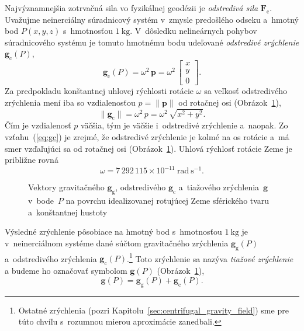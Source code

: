 \documentclass[a4paper,12pt]{book}
\newcommand{\gidx}{\mathrm g}
\newcommand{\cidx}{\mathrm c}
\let\vec\mathbf
\begin{document}
Najvýznamnejšia zotrvačná sila vo fyzikálnej geodézii je \emph{odstredivá sila}
$\vec F_\cidx$.  Uvažujme neinerciálny súradnicový systém v~zmysle predošlého
odseku a~hmotný bod $P(x, y, z)$ s~hmotnosťou $1\ \mathrm{kg}$.  V~dôsledku
nelineárnych pohybov súradnicového systému je tomuto hmotnému bodu udeľované
\emph{odstredivé zrýchlenie} $\vec g_\cidx(P)$,
%
\begin{equation}
\label{eq:gc}
\vec g_\cidx(P) = \omega^2 \, \vec p =
%
\omega^2 \, \begin{bmatrix}
x\\
y\\
0
\end{bmatrix}
{.}
\end{equation}
%
Za predpokladu konštantnej uhlovej rýchlosti rotácie $\omega$ sa veľkosť
odstredivého zrýchlenia mení iba so vzdialenosťou $p = \| \vec p \|$ od 
rotačnej osi (Obrázok~\ref{fig:gravity_vector}),
%
\begin{equation}
\| \vec g_\cidx \| = \omega^2 \, p = \omega^2 \, \sqrt{x^2 + y^2}{.}
\end{equation}
%
Čím je vzdialenosť $p$ väčšia, tým je väčšie i~odstredivé zrýchlenie a~naopak.
Zo vzťahu~(\ref{eq:gc}) je zrejmé, že odstredivé zrýchlenie je kolmé na os
rotácie a~má smer vzďaľujúci sa od rotačnej osi
(Obrázok~\ref{fig:gravity_vector}).  Uhlová rýchlosť rotácie Zeme je približne
rovná \parencite{GRS80}
%
\begin{equation}
\omega = 7\, 292\, 115 \times 10^{-11} \ \mathrm{rad} \ \mathrm{s}^{-1}{.}
\end{equation}

\begin{figure}
\centering

\caption{Vektory gravitačného $\vec g_\gidx$, odstredivého $\vec g_\cidx$
a~tiažového zrýchlenia~$\vec g$ v~bode~$P$ na povrchu idealizovanej rotujúcej
Zeme sférického tvaru a~konštantnej hustoty}
\label{fig:gravity_vector}
\end{figure}

Výsledné zrýchlenie pôsobiace na hmotný bod s~hmotnosťou $1 \ \mathrm{kg}$ je
v~neinerciálnom systéme dané súčtom gravitačného zrýchlenia $\vec g_\gidx(P)$
a~odstredivého zrýchlenia $\vec g_\cidx(P)$.\footnote{Ostatné zrýchlenia (pozri
Kapitolu~\ref{sec:centrifugal_gravity_field}) sme pre túto chvíľu s~rozumnou
mierou aproximácie zanedbali.}  Toto zrýchlenie sa nazýva \emph{tiažové
zrýchlenie} a budeme ho označovať symbolom $\vec g(P)$
(Obrázok~\ref{fig:gravity_vector}),
%
\begin{equation}
\label{eq:g}
\vec g(P) = \vec g_\gidx(P) + \vec g_\cidx(P){.}
\end{equation}
\end{document}
